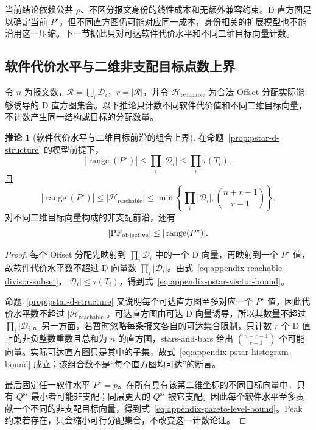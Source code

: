 \documentclass[UTF8,a4paper,twoside,zihao=-4]{ctexart}
\numberwithin{equation}{section}
\numberwithin{figure}{section}
\numberwithin{table}{section}
\theoremstyle{definition}
\newtheorem{corollary}{推论}
\numberwithin{algocf}{section}
\begin{document}
当前结论依赖公共 $\rho$、不区分报文身份的线性成本和无额外兼容约束。D 直方图足以确定当前 $P^\star$，但不同直方图仍可能对应同一成本，身份相关的扩展模型也不能沿用这一压缩。下一节据此只对可达软件代价水平和不同二维目标向量计数。

\subsection{软件代价水平与二维非支配目标点数上界}
\label{subsec:appendix-structure-bounds}

令 $n$ 为报文数，$\mathcal R=\bigcup_i\mathcal D_i$，$r=|\mathcal R|$，并令 $\mathcal H_{\mathrm{reachable}}$ 为合法 Offset 分配实际能够诱导的 D 直方图集合。以下推论只计数不同软件代价值和不同二维目标向量，不计数产生同一结构或目标的分配数量。

\begin{corollary}[软件代价水平与二维目标前沿的组合上界]
\label{cor:pstar-pareto-cardinality}
在命题~\ref{prop:pstar-d-structure} 的模型前提下，
\begin{equation}
 |\operatorname{range}(P^\star)|
 \le\prod_i|\mathcal D_i|
 \le\prod_i\tau(T_i),
\label{eq:appendix-pstar-vector-bound}
\end{equation}
且
\begin{equation}
 |\operatorname{range}(P^\star)|
 \le|\mathcal H_{\mathrm{reachable}}|
 \le\min\left\{
  \prod_i|\mathcal D_i|,
  \binom{n+r-1}{r-1}
 \right\}.
\label{eq:appendix-pstar-histogram-bound}
\end{equation}
对不同二维目标向量构成的非支配前沿，还有
\begin{equation}
 |\mathrm{PF}_{\rm objective}|
 \le|\operatorname{range}(P^\star)|.
\label{eq:appendix-pareto-level-bound}
\end{equation}
\end{corollary}

\begin{proof}
每个 Offset 分配先映射到 $\prod_i\mathcal D_i$ 中的一个 D 向量，再映射到一个 $P^\star$ 值，故软件代价水平数不超过 D 向量数 $\prod_i|\mathcal D_i|$。由式~\eqref{eq:appendix-reachable-divisor-subset}，$|\mathcal D_i|\le\tau(T_i)$，得到式~\eqref{eq:appendix-pstar-vector-bound}。

命题~\ref{prop:pstar-d-structure} 又说明每个可达直方图至多对应一个 $P^\star$ 值，因此代价水平数不超过 $|\mathcal H_{\mathrm{reachable}}|$。可达直方图由可达 D 向量诱导，所以其数量不超过 $\prod_i|\mathcal D_i|$。另一方面，若暂时忽略每条报文各自的可达集合限制，只计数 $r$ 个 D 值上的非负整数重数且总和为 $n$ 的直方图，stars-and-bars 给出 $\binom{n+r-1}{r-1}$ 个可能向量。实际可达直方图只是其中的子集，故式~\eqref{eq:appendix-pstar-histogram-bound} 成立；该组合数不是“每个直方图均可达”的断言。

最后固定任一软件水平 $P^\star=p$。在所有具有该第二维坐标的不同目标向量中，只有 $Q^{\mathrm{ss}}$ 最小者可能非支配；同层更大的 $Q^{\mathrm{ss}}$ 被它支配。因此每个软件水平至多贡献一个不同的非支配目标向量，得到式~\eqref{eq:appendix-pareto-level-bound}。Peak 约束若存在，只会缩小可行分配集合，不改变这一计数论证。
\end{proof}
\end{document}
